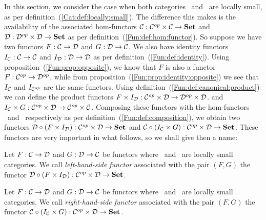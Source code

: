 In this section, we consider the case when both categories \Cat\ and \Dat\ are
locally small, as per definition~(\ref{Cat:def:locally:small}). The difference
this makes is the availability of the associated hom-functors
$\mbox{$\cal C$}:\mbox{${\cal C}^{op}$}\times\mbox{$\cal C$}\to\mbox{\bf Set}$ and $\mbox{$\cal D$}:\mbox{${\cal D}^{op}$}\times\mbox{$\cal D$}\to\mbox{\bf Set}$ as per
definition~(\ref{Fun:def:hom:functor}). So suppose
we have two functors $F:\mbox{$\cal C$}\to\mbox{$\cal D$}$ and $G:\mbox{$\cal D$}\to\mbox{$\cal C$}$. We also have
identity functors $I_{\cal C}:\mbox{$\cal C$}\to\mbox{$\cal C$}$ and $I_{\cal D}:\mbox{$\cal D$}\to\mbox{$\cal D$}$
as per definition~(\ref{Fun:def:identity}). Using 
proposition~(\ref{Fun:prop:opposite}), we know that $F$ is also a functor 
$F:\mbox{${\cal C}^{op}$}\to\mbox{${\cal D}^{op}$}$, while from proposition~(\ref{Fun:prop:identity:opposite})
we see that $I_{\cal C}$ and $I_{{\cal C}^{op}}$ are the same functors.
Using definition~(\ref{Fun:def:canonical:product}) we can define the 
product functors $F\times I_{\cal D}:\mbox{${\cal C}^{op}$}\times\mbox{$\cal D$}\to\mbox{${\cal D}^{op}$}\times\mbox{$\cal D$}$.
and $I_{\cal C}\times G:\mbox{${\cal C}^{op}$}\times\mbox{$\cal D$}\to\mbox{${\cal C}^{op}$}\times\mbox{$\cal C$}$. Composing 
these functors with the hom-functors \Dat\ and \Cat\ respectively as per
definition~(\ref{Fun:def:composition}), we obtain
two functors $\mbox{$\cal D$}\circ(F\times I_{\cal D}):\mbox{${\cal C}^{op}$}\times\mbox{$\cal D$}\to\mbox{\bf Set}$ and
$\mbox{$\cal C$}\circ(I_{\cal C}\times G):\mbox{${\cal C}^{op}$}\times\mbox{$\cal D$}\to\mbox{\bf Set}$. These functors 
are very important in what follows, so we shall give then a name:

\begin{defin}\label{Adj:def:lhs:functor}
    Let $F:\mbox{$\cal C$}\to\mbox{$\cal D$}$ and $G:\mbox{$\cal D$}\to\mbox{$\cal C$}$ be functors where \Cat\ and \Dat\ 
    are locally small categories. We call {\em left-hand-side functor} associated
    with the pair $(F,G)$ the functor $\mbox{$\cal D$}\circ(F\times I_{\cal D}):\mbox{${\cal C}^{op}$}\times
    \mbox{$\cal D$}\to\mbox{\bf Set}$.
\end{defin}

\begin{defin}\label{Adj:def:rhs:functor}
    Let $F:\mbox{$\cal C$}\to\mbox{$\cal D$}$ and $G:\mbox{$\cal D$}\to\mbox{$\cal C$}$ be functors where \Cat\ and \Dat\ 
    are locally small categories. We call {\em right-hand-side functor} associated
    with the pair $(F,G)$ the functor $\mbox{$\cal C$}\circ(I_{\cal C}\times G):\mbox{${\cal C}^{op}$}\times
    \mbox{$\cal D$}\to\mbox{\bf Set}$.
\end{defin}

